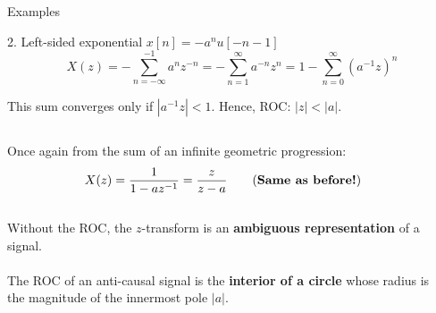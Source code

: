 \documentclass[10pt]{beamer}
\begin{document}
%
\begin{frame}{Examples}
\begin{block}{2. Left-sided exponential $x[n] = -a^nu[-n-1]$}
	\begin{equation*} 
	X(z) = -\sum_{n=-\infty}^{-1} a^nz^{-n} = -\sum_{n=1}^{\infty} a^{-n}z^{n} = 1-\sum_{n=0}^{\infty} (a^{-1}z)^{n}
	\end{equation*}
	
	This sum converges only if $|a^{-1}z| < 1$. Hence, ROC: $|z| < |a|$.
	
	\begin{columns}
		\begin{column}{0.6\textwidth}
			Once again from the sum of an infinite geometric progression:
			\begin{equation*} 
				X(z) = \frac{1}{1-az^{-1}} = \frac{z}{z-a}\tag{\textbf{Same as before!}}
			\end{equation*}
			~\\
			Without the ROC, the $z$-transform is an \textbf{ambiguous representation} of a signal.
			~\\
			~\\
			The ROC of an anti-causal signal is the \textbf{interior of a circle} whose radius is the magnitude of the innermost pole $|a|$.
		\end{column}
		\begin{column}{0.4\textwidth}  %
			\resizebox{1.18\linewidth}{!}{}
		\end{column}
	\end{columns}
	
\end{block}
\end{frame}
\end{document}
